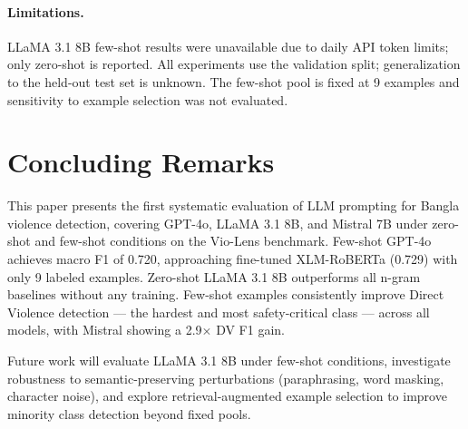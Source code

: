\documentclass[sigconf,nonacm]{acmart}
\begin{document}
\paragraph{Limitations.}
LLaMA 3.1 8B few-shot results were unavailable due to daily API token limits; only zero-shot is reported. All experiments use the validation split; generalization to the held-out test set is unknown. The few-shot pool is fixed at 9 examples and sensitivity to example selection was not evaluated.

\section{Concluding Remarks}

This paper presents the first systematic evaluation of LLM prompting for Bangla violence detection, covering GPT-4o, LLaMA 3.1 8B, and Mistral 7B under zero-shot and few-shot conditions on the Vio-Lens benchmark. Few-shot GPT-4o achieves macro F1 of 0.720, approaching fine-tuned XLM-RoBERTa (0.729) with only 9 labeled examples. Zero-shot LLaMA 3.1 8B outperforms all n-gram baselines without any training. Few-shot examples consistently improve Direct Violence detection — the hardest and most safety-critical class — across all models, with Mistral showing a 2.9$\times$ DV F1 gain.

Future work will evaluate LLaMA 3.1 8B under few-shot conditions, investigate robustness to semantic-preserving perturbations (paraphrasing, word masking, character noise), and explore retrieval-augmented example selection to improve minority class detection beyond fixed pools.



\end{document}
